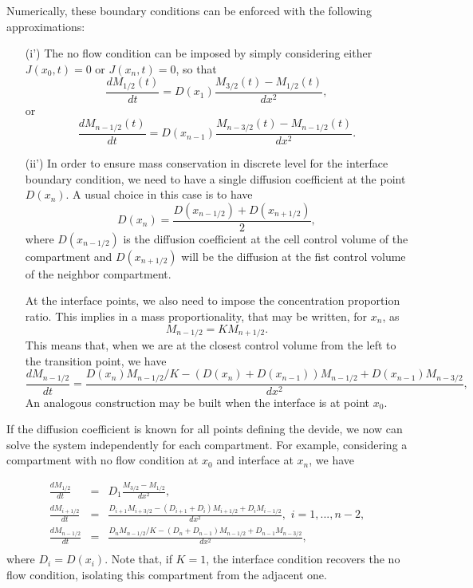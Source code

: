 \documentclass[final,1p,times]{elsarticle}
\begin{document}
Numerically, these boundary conditions can be enforced with the following approximations:
\begin{enumerate}
\item[(i')] The no flow condition can be imposed by simply considering either $J(x_0,t)=0$ or $J(x_n,t)=0$, so that
\begin{equation}
\frac{d M_{1/2}(t)}{dt}= D(x_{1})\frac{M_{3/2}(t)-M_{1/2}(t) }{dx^2},
\end{equation}
or
\begin{equation}
\frac{d M_{n-1/2}(t)}{dt}= D(x_{n-1})\frac{M_{n-3/2}(t)-M_{n-1/2}(t) }{dx^2}.
\end{equation}

\item[(ii')] 
In order to ensure mass conservation in discrete level for the interface boundary condition, we need to have a single diffusion coefficient at the point $D(x_n)$. A usual choice in this case is to have
\begin{equation}
D(x_n)= \frac{D(x_{n-1/2})+D(x_{n+1/2})}{2},
\end{equation}
where $D(x_{n-1/2})$ is the diffusion coefficient at the cell control volume of the compartment and $D(x_{n+1/2})$ will be the diffusion at the fist control volume of the neighbor compartment.

At the interface points, we also need to impose the concentration proportion ratio. This implies in a mass proportionality, that may be written, for $x_n$, as
\begin{equation}
M_{n-1/2}=K M_{n+1/2}.
\end{equation}
This means that, when we are at the closest control volume from the left to the transition point, we have
\begin{equation}
\frac{d M_{n-1/2}}{dt}= \frac{D(x_{n})M_{n-1/2}/K-(D(x_{n})+D(x_{n-1}))M_{n-1/2} + D(x_{n-1})M_{n-3/2}}{dx^2},
\end{equation}
An analogous construction may be built when the interface is at point $x_0$.
\end{enumerate}


If the diffusion coefficient is known for all points defining the devide, we now can solve the system independently for each compartment. For example, considering a compartment with no flow condition at $x_0$ and interface at $x_n$, we have

\begin{eqnarray*}
\frac{d M_{1/2}}{dt}&=& D_1\frac{M_{3/2}-M_{1/2} }{dx^2},\\
\frac{d M_{i+1/2}}{dt}&=& \frac{D_{i+1}M_{i+3/2}-(D_{i+1}+D_{i})M_{i+1/2} + D_iM_{i-1/2}}{dx^2}, \,\, i=1,...,n-2,\\
\frac{d M_{n-1/2}}{dt}&=& \frac{D_{n}M_{n-1/2}/K-(D_{n}+D_{n-1})M_{n-1/2} + D_{n-1}M_{n-3/2}}{dx^2}, \\
\end{eqnarray*}
where $D_i=D(x_i)$. Note that, if $K=1$, the interface condition recovers the no flow condition, isolating this compartment from the adjacent one.
\end{document}
